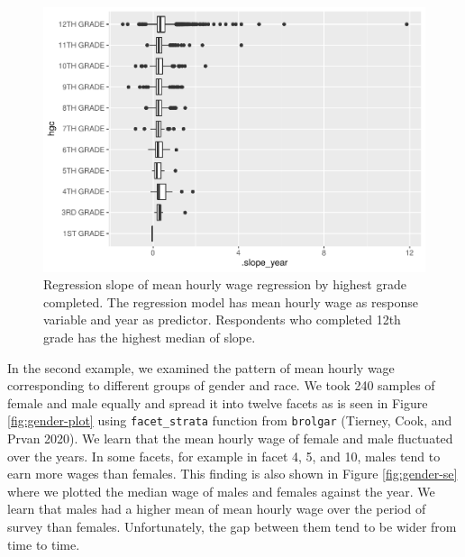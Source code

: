 \documentclass{article}
\begin{document}
\begin{figure}
\centering
\includegraphics{figures/wages-slope-1.pdf}
\caption{Regression slope of mean hourly wage regression by highest grade completed. The regression model has mean hourly wage as response variable and year as predictor. Respondents who completed 12th grade has the highest median of slope.}
\end{figure}

In the second example, we examined the pattern of mean hourly wage corresponding to different groups of gender and race. We took 240 samples of female and male equally and spread it into twelve facets as is seen in Figure \ref{fig:gender-plot} using \texttt{facet\_strata} function from \texttt{brolgar} (Tierney, Cook, and Prvan 2020). We learn that the mean hourly wage of female and male fluctuated over the years. In some facets, for example in facet 4, 5, and 10, males tend to earn more wages than females. This finding is also shown in Figure \ref{fig:gender-se} where we plotted the median wage of males and females against the year. We learn that males had a higher mean of mean hourly wage over the period of survey than females. Unfortunately, the gap between them tend to be wider from time to time.
\end{document}

